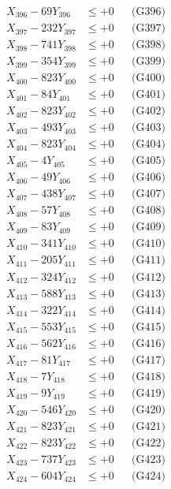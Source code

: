 \documentclass[a4paper,10pt]{article}
\begin{document}
{\begin{align}
X_{396} - 69Y_{396} &\leq +0 && \text{(G396)} \\
X_{397} - 232Y_{397} &\leq +0 && \text{(G397)} \\
X_{398} - 741Y_{398} &\leq +0 && \text{(G398)} \\
X_{399} - 354Y_{399} &\leq +0 && \text{(G399)} \\
X_{400} - 823Y_{400} &\leq +0 && \text{(G400)} \\
\allowbreak
X_{401} - 84Y_{401} &\leq +0 && \text{(G401)} \\
X_{402} - 823Y_{402} &\leq +0 && \text{(G402)} \\
X_{403} - 493Y_{403} &\leq +0 && \text{(G403)} \\
X_{404} - 823Y_{404} &\leq +0 && \text{(G404)} \\
X_{405} - 4Y_{405} &\leq +0 && \text{(G405)} \\
X_{406} - 49Y_{406} &\leq +0 && \text{(G406)} \\
X_{407} - 438Y_{407} &\leq +0 && \text{(G407)} \\
X_{408} - 57Y_{408} &\leq +0 && \text{(G408)} \\
X_{409} - 83Y_{409} &\leq +0 && \text{(G409)} \\
X_{410} - 341Y_{410} &\leq +0 && \text{(G410)} \\
\allowbreak
X_{411} - 205Y_{411} &\leq +0 && \text{(G411)} \\
X_{412} - 324Y_{412} &\leq +0 && \text{(G412)} \\
X_{413} - 588Y_{413} &\leq +0 && \text{(G413)} \\
X_{414} - 322Y_{414} &\leq +0 && \text{(G414)} \\
X_{415} - 553Y_{415} &\leq +0 && \text{(G415)} \\
X_{416} - 562Y_{416} &\leq +0 && \text{(G416)} \\
X_{417} - 81Y_{417} &\leq +0 && \text{(G417)} \\
X_{418} - 7Y_{418} &\leq +0 && \text{(G418)} \\
X_{419} - 9Y_{419} &\leq +0 && \text{(G419)} \\
X_{420} - 546Y_{420} &\leq +0 && \text{(G420)} \\
\allowbreak
X_{421} - 823Y_{421} &\leq +0 && \text{(G421)} \\
X_{422} - 823Y_{422} &\leq +0 && \text{(G422)} \\
X_{423} - 737Y_{423} &\leq +0 && \text{(G423)} \\
X_{424} - 604Y_{424} &\leq +0 && \text{(G424)} \\

\end{align}}
\end{document}
